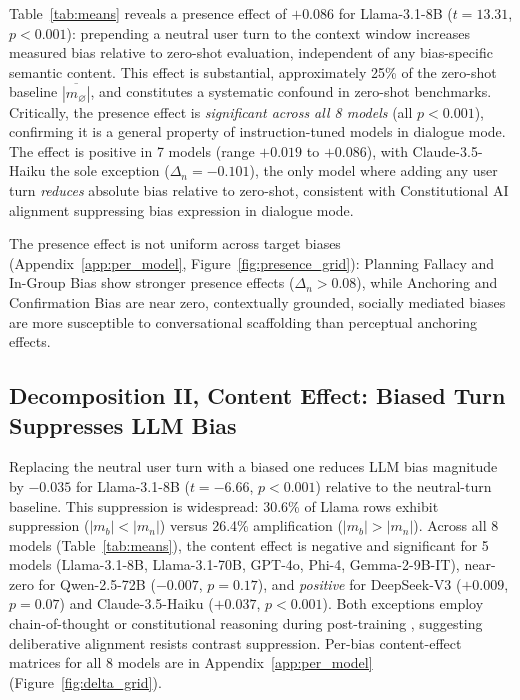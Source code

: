 \documentclass[11pt]{article}
\begin{document}
Table~\ref{tab:means} reveals a presence effect of $+0.086$ for Llama-3.1-8B ($t{=}13.31$, $p{<}0.001$): prepending a neutral user turn to the context window increases measured bias relative to zero-shot evaluation, independent of any bias-specific semantic content. This effect is substantial, approximately 25\% of the zero-shot baseline $\overline{|m_\varnothing|}$, and constitutes a systematic confound in zero-shot benchmarks. Critically, the presence effect is \emph{significant across all 8 models} (all $p{<}0.001$), confirming it is a general property of instruction-tuned models in dialogue mode. The effect is positive in 7 models (range $+0.019$ to $+0.086$), with Claude-3.5-Haiku the sole exception ($\Delta_n = -0.101$), the only model where adding any user turn \emph{reduces} absolute bias relative to zero-shot, consistent with Constitutional AI alignment suppressing bias expression in dialogue mode.

The presence effect is not uniform across target biases (Appendix~\ref{app:per_model}, Figure~\ref{fig:presence_grid}): Planning Fallacy and In-Group Bias show stronger presence effects ($\Delta_n > 0.08$), while Anchoring and Confirmation Bias are near zero, contextually grounded, socially mediated biases are more susceptible to conversational scaffolding than perceptual anchoring effects.

\subsection{Decomposition II, Content Effect: Biased Turn Suppresses LLM Bias}

Replacing the neutral user turn with a biased one reduces LLM bias magnitude by $-0.035$ for Llama-3.1-8B ($t{=}{-6.66}$, $p{<}0.001$) relative to the neutral-turn baseline. This suppression is widespread: 30.6\% of Llama rows exhibit suppression ($|m_b| < |m_n|$) versus 26.4\% amplification ($|m_b| > |m_n|$). Across all 8 models (Table~\ref{tab:means}), the content effect is negative and significant for 5 models (Llama-3.1-8B, Llama-3.1-70B, GPT-4o, Phi-4, Gemma-2-9B-IT), near-zero for Qwen-2.5-72B ($-0.007$, $p{=}0.17$), and \emph{positive} for DeepSeek-V3 ($+0.009$, $p{=}0.07$) and Claude-3.5-Haiku ($+0.037$, $p{<}0.001$). Both exceptions employ chain-of-thought or constitutional reasoning during post-training \citep{bai2022constitutional}, suggesting deliberative alignment resists contrast suppression. Per-bias content-effect matrices for all 8 models are in Appendix~\ref{app:per_model} (Figure~\ref{fig:delta_grid}).
\end{document}

